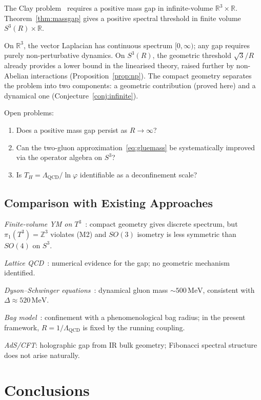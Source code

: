 \documentclass[
  aps,
  prd,
  reprint,
  superscriptaddress,
  nofootinbib,
  longbibliography,
  amsmath,
  amssymb
]{revtex4-2}
\theoremstyle{plain}
\theoremstyle{definition}
\theoremstyle{remark}
\newcommand{\vp}{\varphi}
\newcommand{\Lqcd}{\Lambda_{\mathrm{QCD}}}
\begin{document}
The Clay problem~\cite{Jaffe2000} requires a positive mass gap in
infinite-volume $\mathbb{R}^3\times\mathbb{R}$. Theorem~\ref{thm:massgap}
gives a positive spectral threshold in finite volume $S^3(R)\times\mathbb{R}$.

On $\mathbb{R}^3$, the vector Laplacian has continuous spectrum
$[0,\infty)$; any gap requires purely non-perturbative dynamics.
On $S^3(R)$, the geometric threshold $\sqrt3/R$ already provides a
lower bound in the linearised theory, raised further by non-Abelian
interactions (Proposition~\ref{prop:np}). The compact geometry
separates the problem into two components: a geometric contribution
(proved here) and a dynamical one (Conjecture~\ref{conj:infinite}).

Open problems:
\begin{enumerate}[label=(\arabic*),noitemsep]
\item Does a positive mass gap persist as $R\to\infty$?
\item Can the two-gluon approximation~\eqref{eq:gluemass} be
  systematically improved via the operator algebra on $S^3$?
\item Is $T_H=\Lqcd/\ln\vp$ identifiable as a deconfinement scale?
\end{enumerate}

\subsection{Comparison with Existing Approaches}

\emph{Finite-volume YM on $T^3$}~\cite{Luscher1983}: compact geometry
gives discrete spectrum, but $\pi_1(T^3)=\mathbb{Z}^3$ violates (M2)
and $SO(3)$ isometry is less symmetric than $SO(4)$ on $S^3$.

\emph{Lattice QCD}~\cite{Morningstar1999,Chen2006}: numerical evidence
for the gap; no geometric mechanism identified.

\emph{Dyson--Schwinger equations}~\cite{Aguilar2020}: dynamical gluon
mass $\sim500\,\mathrm{MeV}$, consistent with $\Delta\approx520\,\mathrm{MeV}$.

\emph{Bag model}~\cite{Chodos1974}: confinement with a phenomenological
bag radius; in the present framework, $R=1/\Lqcd$ is fixed by the
running coupling.

\emph{AdS/CFT}: holographic gap from IR bulk geometry; Fibonacci
spectral structure does not arise naturally.

\section{Conclusions}
\label{sec:conclusions}
\end{document}
